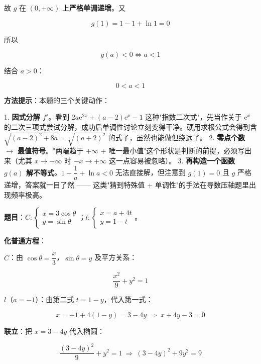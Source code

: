 故 $g$ 在 $(0,+\infty)$ 上\textbf{严格单调递增}。又

\[g(1)=1-1+\ln1=0\]

所以

\[g(a)<0\iff a<1\]

结合 $a>0$：

\[0<a<1\]


\begin{gktip}
\textbf{方法提示}：本题的三个关键动作：

1. \textbf{因式分解 $f'$}。看到 $2a\mathrm e^{2x}+(a-2)\mathrm e^{x}-1$ 这种"指数二次式"，先当作关于 $\mathrm e^{x}$ 的二次三项式尝试分解，成功后单调性讨论立刻变得干净。硬用求根公式会得到含 $\sqrt{(a-2)^{2}+8a}=\sqrt{(a+2)^{2}}$ 的式子，虽然也能做但绕远了。
2. \textbf{零点个数 $\to$ 最值符号}。"两端趋于 $+\infty$ + 唯一最小值"这个形状是判断的前提，必须写出来（尤其 $x\to-\infty$ 时 $-x\to+\infty$ 这一点容易被忽略）。
3. \textbf{再构造一个函数 $g(a)$ 解不等式}。$1-\dfrac1a+\ln a<0$ 无法直接解，但注意到 $g(1)=0$ 且 $g$ 严格递增，答案就一目了然 —— 这类"猜到特殊值 + 单调性"的手法在导数压轴题里出现频率极高。
\end{gktip}

\par\medskip



\textbf{题目}：$C:\begin{cases}x=3\cos\theta\\ y=\sin\theta\end{cases}$；$l:\begin{cases}x=a+4t\\ y=1-t\end{cases}$。


\textbf{化普通方程}：

$C$：由 $\cos\theta=\dfrac x3$，$\sin\theta=y$ 及平方关系：

\[\frac{x^{2}}9+y^{2}=1\]

$l$（$a=-1$）：由第二式 $t=1-y$，代入第一式：

\[x=-1+4(1-y)=3-4y\ \Longrightarrow\ x+4y-3=0\]

\textbf{联立}：把 $x=3-4y$ 代入椭圆：

\[\frac{(3-4y)^{2}}9+y^{2}=1\ \Longrightarrow\ (3-4y)^{2}+9y^{2}=9\]

